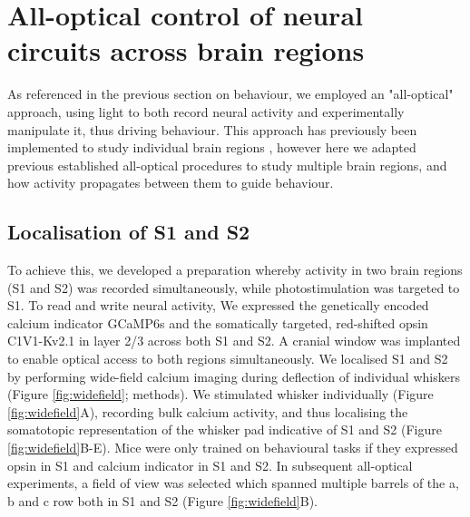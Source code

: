 \chapter{\label{res2}All-optical control of neural circuits across brain regions}

\minitoc

As referenced in the previous section on behaviour, we employed an "all-optical" approach, using light to both record neural activity and experimentally manipulate it, thus driving behaviour. This approach has previously been implemented to study individual brain regions \cite{dalgleish_how_2020, gill_precise_2020, russell_influence_2019, daie_targeted_2021, marshel_cortical_2019}, however here we adapted previous established all-optical procedures to study multiple brain regions, and how activity propagates between them to guide behaviour. 

\section{Localisation of S1 and S2}

To achieve this, we developed a preparation whereby activity in two brain regions (S1 and S2) was recorded simultaneously, while photostimulation was targeted to S1. To read and write neural activity, We expressed the genetically encoded calcium indicator GCaMP6s \cite{chen_ultrasensitive_2013} and the somatically targeted, red-shifted opsin C1V1-Kv2.1 \cite{yizhar_neocortical_2011, chettih_single-neuron_2019} in layer 2/3 across both S1 and S2. A cranial window was implanted to enable optical access to both regions simultaneously. We localised S1 and S2 by performing wide-field calcium imaging during deflection of individual whiskers (Figure \ref{fig:widefield}; methods). We stimulated whisker individually (Figure \ref{fig:widefield}A), recording bulk calcium activity, and thus localising the somatotopic representation of the whisker pad indicative of S1 and S2 (Figure \ref{fig:widefield}B-E). Mice were only trained on behavioural tasks if they expressed opsin in S1 and calcium indicator in S1 and S2. In subsequent all-optical experiments, a field of view was selected which spanned multiple barrels of the a, b and c row both in S1 and S2 (Figure \ref{fig:widefield}B).

